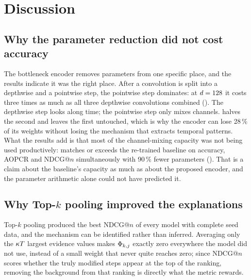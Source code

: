 %

\section{Discussion}
\label{sec:discussion}

\subsection{Why the parameter reduction did not cost accuracy}
\label{sec:disc:worked}

The bottleneck encoder removes parameters from one specific place, and the results indicate it was
the right place. After a convolution is split into a depthwise and a pointwise step, the pointwise
step dominates: at $d = 128$ it costs three times as much as all three depthwise convolutions
combined (). The depthwise step looks along time; the pointwise step only mixes
channels.  halves the second and leaves the first untouched, which is why the
encoder can lose 28\,\% of its weights without losing the mechanism that extracts temporal patterns.
What the results add is that most of the channel-mixing capacity was not being used productively:
\mbot{} matches or exceeds the re-trained \millet{} baseline on accuracy, AOPCR and NDCG@$n$
simultaneously with 90\,\% fewer parameters (). That is a claim about the
baseline's capacity as much as about the proposed encoder, and the parameter arithmetic alone could
not have predicted it.

\subsection{Why Top-$k$ pooling improved the explanations}
\label{sec:disc:topk}

Top-$k$ pooling produced the best NDCG@$n$ of every model with complete seed data, and the mechanism
can be identified rather than inferred. Averaging only the $\kappa T$ largest evidence values
makes $\Phi_{k,j}$ exactly zero everywhere the model did not use, instead of a small weight that
never quite reaches zero; since NDCG@$n$ scores whether the truly
modified steps appear at the top of the ranking, removing the background from that ranking is
directly what the metric rewards.

